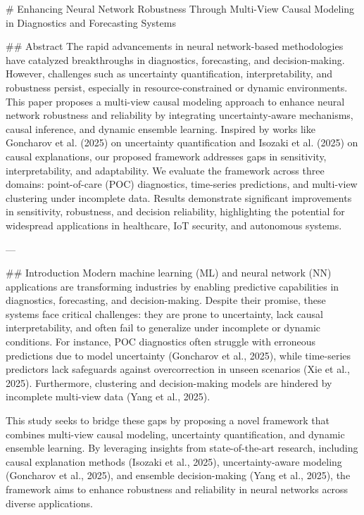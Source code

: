 # Enhancing Neural Network Robustness Through Multi-View Causal Modeling in Diagnostics and Forecasting Systems

## Abstract
The rapid advancements in neural network-based methodologies have catalyzed breakthroughs in diagnostics, forecasting, and decision-making. However, challenges such as uncertainty quantification, interpretability, and robustness persist, especially in resource-constrained or dynamic environments. This paper proposes a multi-view causal modeling approach to enhance neural network robustness and reliability by integrating uncertainty-aware mechanisms, causal inference, and dynamic ensemble learning. Inspired by works like Goncharov et al. (2025) on uncertainty quantification and Isozaki et al. (2025) on causal explanations, our proposed framework addresses gaps in sensitivity, interpretability, and adaptability. We evaluate the framework across three domains: point-of-care (POC) diagnostics, time-series predictions, and multi-view clustering under incomplete data. Results demonstrate significant improvements in sensitivity, robustness, and decision reliability, highlighting the potential for widespread applications in healthcare, IoT security, and autonomous systems.

---

## Introduction
Modern machine learning (ML) and neural network (NN) applications are transforming industries by enabling predictive capabilities in diagnostics, forecasting, and decision-making. Despite their promise, these systems face critical challenges: they are prone to uncertainty, lack causal interpretability, and often fail to generalize under incomplete or dynamic conditions. For instance, POC diagnostics often struggle with erroneous predictions due to model uncertainty (Goncharov et al., 2025), while time-series predictors lack safeguards against overcorrection in unseen scenarios (Xie et al., 2025). Furthermore, clustering and decision-making models are hindered by incomplete multi-view data (Yang et al., 2025).

This study seeks to bridge these gaps by proposing a novel framework that combines multi-view causal modeling, uncertainty quantification, and dynamic ensemble learning. By leveraging insights from state-of-the-art research, including causal explanation methods (Isozaki et al., 2025), uncertainty-aware modeling (Goncharov et al., 2025), and ensemble decision-making (Yang et al., 2025), the framework aims to enhance robustness and reliability in neural networks across diverse applications.

